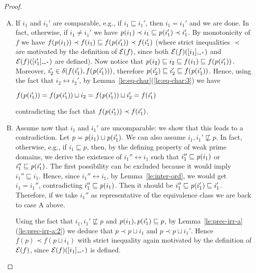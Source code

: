 \begin{proof}
\begin{itemize}
    \begin{enumerate}[A.]
    \item If $i_1$ and $i_1'$ are comparable, e.g.,
      if $i_1 \sqsubseteq i_1'$, then $i_1 = i_1'$ and we are
      done. In fact, otherwise, if $i_1 \neq i_1'$ we have
      $\mathit{p}({i_1}) \prec i_1 \sqsubseteq \mathit{p}({i_1'}) \prec i_1'$.  By
      monotonicity of $f$ we have
      $f(\mathit{p}({i_1})) \prec f(i_1) \sqsubseteq f(\mathit{p}({i_1'})) \prec
      f(i_1')$
      (where strict inequalities $\prec$  are motivated by the 
      definition of $\mathcal{E}({f})$, since
      both $\mathcal{E}({f})([{i_1}]_{\scriptscriptstyle {\leftrightarrow^*}})$ and $\mathcal{E}({f})([{i_1'}]_{\scriptscriptstyle {\leftrightarrow^*}})$
      are defined).
      Now notice that
      $\mathit{p}({i_2}) \sqsubseteq i_2 \sqsubseteq f(i_1) \sqsubseteq
      f(\mathit{p}({i_1'}))$. Moreover,
      $i_2' \in \delta({f(i_1')},{f(\mathit{p}({i_1'}))})$, therefore
      $\mathit{p}({i_2'}) \sqsubseteq i_2' \sqsubseteq f(\mathit{p}({i_1'}))$.
      Hence, using the fact that $i_2 \leftrightarrow i_2'$, by
      Lemma~\ref{le:eq-char}(\ref{le:eq-char:3}) we have
      \begin{center}
        $f(\mathit{p}({i_1'})) = f(\mathit{p}({i_1'})) \sqcup i_2 = f(\mathit{p}({i_1'}))
        \sqcup i_2' = f(i_1')$
      \end{center}
      contradicting  the fact that $f(\mathit{p}({i_1'})) \prec f(i_1')$.
    
      \smallskip
      
    \item Assume now that $i_1$ and $i_1'$ are uncomparable{: we show that this leads to a contradiction.}   Let 
      $p = \mathit{p}({i_1}) \sqcup \mathit{p}({i_1'})$. We can also assume
      $i_1, i_1' \not\sqsubseteq p$. In fact, otherwise, e.g., if
      $i_1 \sqsubseteq p$, then, by the defining property of weak
      prime domains, we derive the existence of
      $i_1'' \leftrightarrow i_1$ such that
      $i_1'' \sqsubseteq \mathit{p}({i_1})$ or
      $i_1'' \sqsubseteq \mathit{p}({i'_1})$. The first possibility can be
      excluded because it would imply $i_1'' \sqsubseteq i_1$. Hence,
      since $i_1'' \leftrightarrow i_1$, by
      Lemma~\ref{le:inter-ord}, we would get $i_1=i_1''$,
      contradicting $i_1'' \sqsubseteq \mathit{p}({i_1})$. Then it should be
      $i_1'' \sqsubseteq \mathit{p}({i_1'}) \sqsubseteq i_1'$. Therefore, if
      we take $i_1''$ as representative of the equivalence class we
      are back to case A above.

      Using the fact that $i_1, i_1' \not\sqsubseteq p$ and
      $\mathit{p}({i_1}), \mathit{p}({i_1'}) \sqsubseteq p$, by
      Lemma~\ref{le:prec-irr-a}(\ref{le:prec-irr-a:2}) we deduce that
      $p \prec p \sqcup i_1$ and $p \prec p \sqcup i_1'$.
      Hence $f(p) \prec f(p \sqcup i_1)$ with strict inequality again
      motivated by the definition of $\mathcal{E}({f})$, since
      $\mathcal{E}({f})([{i_1}]_{\scriptscriptstyle {\leftrightarrow^*}})$ is defined.


\end{enumerate}
\end{itemize}
\end{proof}
